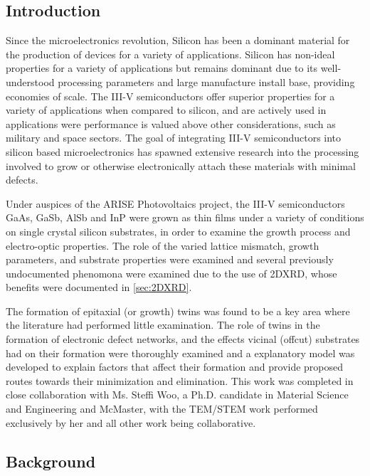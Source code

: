 \subsection{Introduction}
Since the microelectronics revolution, Silicon has been a dominant material 
for the production of devices for a variety of applications. Silicon has 
non-ideal properties for a variety of applications but remains dominant due 
to its well-understood processing parameters and large manufacture install 
base, providing economies of scale. The III-V semiconductors offer superior 
properties for a variety of applications when compared to silicon, and are 
actively used in applications were performance is valued above other 
considerations, such as military and space sectors. The goal of integrating 
III-V semiconductors into silicon based microelectronics has spawned extensive 
research into the processing involved to grow or otherwise electronically 
attach these materials with minimal defects.

Under auspices of the ARISE Photovoltaics project, the III-V 
semiconductors GaAs, GaSb, AlSb and InP were grown as thin films under a 
variety of conditions on single crystal silicon substrates, in order to 
examine the growth process and electro-optic properties. The role of the 
varied lattice mismatch, growth parameters, and substrate properties were 
examined and several previously undocumented phenomona were examined due to 
the use of 2DXRD, whose benefits were documented in \cref{sec:2DXRD}.

The formation of epitaxial (or growth) twins was found to be a key area where 
the literature had performed little examination. The role of twins in the 
formation of electronic defect networks, and the effects vicinal (offcut) 
substrates had on their formation were thoroughly examined and a 
explanatory model was developed to explain factors that affect their formation 
and provide proposed routes towards their minimization and 
elimination\cite{Devenyi2011}. This work was completed in close collaboration 
with Ms. Steffi Woo, a Ph.D. candidate in Material Science and Engineering and 
McMaster, with the TEM/STEM work performed exclusively by her and all other 
work being collaborative.

\subsection{Background}


